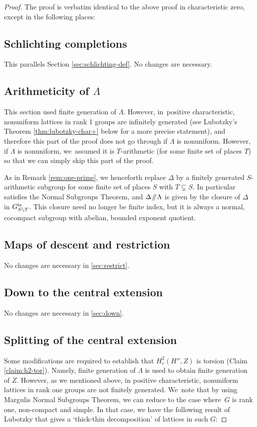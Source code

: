 \documentclass[JEP,XML,SOM,Unicode,published]{cedram}
\let\bs\backslash
\newcommand{\sslash}{\mathbin{\mkern-3mu /\mkern-5mu/ \mkern-3mu}}
\theoremstyle{definition}
\begin{document}
\begin{proof} The proof is verbatim identical to the above proof in characteristic zero, except in the following places:

\subsection{Schlichting completions} This parallels Section \ref{sec:schlichting-def}. No changes are necessary.

\subsection{Arithmeticity of $\Lambda$} \label{sec:arithm-char+}
This section used finite generation of $\Lambda$. However, in~positive characteristic, nonuniform lattices in rank 1 groups are infinitely generated (see Lubotzky's Theorem \ref{thm:lubotzky-char+} below for a more precise statement), and therefore this part of the proof does not go through if $\Lambda$ is nonuniform. However, if $\Lambda$ is nonuniform, we~assumed it is $T$-arithmetic (for some finite set of places $T$) so that we can simply skip this part of the proof.

As in Remark \ref{rem:one-prime}, we henceforth replace $\Delta$ by a finitely generated $S$-arithmetic subgroup for some finite set of places $S$ with $T\subsetneq S$. In particular satisfies the Normal Subgroups Theorem, and $\Delta\sslash\Lambda$ is given by the closure of $\Delta$ in $G_{S\bs T}^{\textup{is}}$. This closure need no longer be finite index, but it is always a normal, cocompact subgroup with abelian, bounded exponent quotient.

\subsection{Maps of descent and restriction} No changes are necessary in \ref{sec:restrict}.

\subsection{Down to the central extension} No changes are necessary in \ref{sec:down}.

\subsection{Splitting of the central extension} Some modifications are required to establish that $H^2_c(H'',Z)$ is torsion (Claim \ref{claim:h2-tor}). Namely, finite generation of $\Lambda$ is used to obtain finite generation of $Z$. However, as we mentioned above, in positive characteristic, nonuniform lattices in rank one groups are not finitely generated. We~note that by using Margulis Normal Subgroups Theorem, we can reduce to the case where~$G$ is rank one, non-compact and simple. In that case, we have the following result of Lubotzky that gives a `thick-thin decomposition' of lattices in such $G$:


\end{proof}
\end{document}
